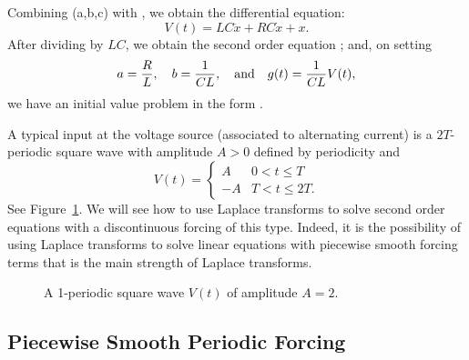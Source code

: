 \documentclass{ximera}
\begin{document}
Combining (a,b,c) with , we obtain the differential equation:
\[
V(t) = LC\ddot{x} + RC\dot{x} +  x.
\]
After dividing by $LC$, we obtain the second order equation ;
and, on setting 
\[
a = \frac{R}{L}, \quad b = \frac{1}{CL}, \quad\mbox{and}\quad g(t) = \frac{1}{CL}V(t),
\] 
we have an initial value problem in the form .

A typical input at the voltage source 
(associated to alternating current) is 
a $2T$-periodic square wave with amplitude $A>0$ defined by periodicity and
\[
V(t) = \left\{\begin{array}{rl} A & 0<t\leq T\\
			       -A & T<t\leq 2T.
	\end{array}\right.
\]
See Figure~\ref{fig:sq}.  We will see how to use Laplace transforms to solve 
second order equations with a discontinuous forcing 
of this type.  Indeed,
it is the possibility of using Laplace transforms to solve linear equations 
with piecewise smooth forcing terms that is 
the main strength of Laplace
transforms.

\begin{figure}[htb]
           \centerline{%
           }
           \caption{A 1-periodic square wave $V(t)$ of amplitude $A=2$.}
           \label{fig:sq}
\end{figure}


\subsection*{Piecewise Smooth Periodic Forcing}
\end{document}
